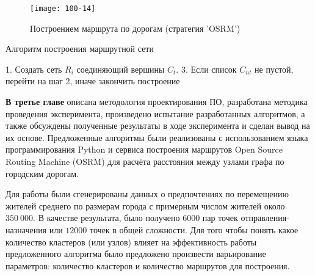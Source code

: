 \begin{figure}[ht!]
    \centering
    \texttt{[image: 100-14]}
    \caption{Построением маршрута по дорогам (стратегия 'OSRM')}
    \label{fig:osrm}
\end{figure}

\begin{algorithm}[ht!]
    \caption{Алгоритм построения маршрутной сети}
    1. Создать сеть \( R_i \) соединяющий вершины \( C_t \). 
    3. Если список \( C_{nt} \) не пустой, перейти на шаг 2, иначе закончить построение\;
    \label{alg:min-length}
\end{algorithm}

\clearpage

\textbf{В третье главе} описана методология проектирования ПО, разработана методика проведения эксперимента, 
произведено испытание разработанных алгоритмов, а также обсуждены полученные результаты в ходе эксперимента 
и сделан вывод на их основе. Предложенные алгоритмы были реализованы с использованием языка программирования 
Python и сервиса построения маршрутов Open Source Routing Machine (OSRM) для расчёта расстояния между узлами 
графа по городским дорогам.

Для работы были сгенерированы данных о предпочтениях по перемещению жителей среднего по размерам города с 
примерным числом жителей около \( 350\ 000 \). В качестве результата, было получено \( 6000 \) пар точек 
отправления-назначения или \( 12000 \) точек в общей сложности. Для того чтобы понять какое количество 
кластеров (или узлов) влияет на эффективность работы предложенного алгоритма было предложено произвести 
варьирование параметров: количество кластеров и количество маршрутов для построения.

